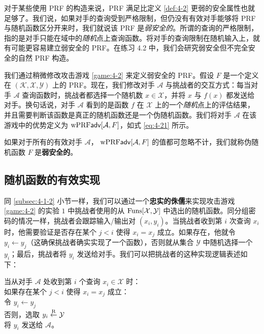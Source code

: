 \begin{snote}[弱安全的伪随机函数。]
对于某些使用 PRF 的构造来说，PRF 满足比定义 \ref{def:4-2} 更弱的安全属性也就足够了。我们说，如果对手的查询受到严格限制，但仍没有有效对手能够将 PRF 与随机函数区分开来时，我们就说该 PRF 是\emph{弱安全的}。所谓的查询的严格限制，指的是对手只能在域中的\emph{随机}点上查询函数。将对手的查询限制在随机输入上，就有可能更容易建立弱安全的 PRF。在练习 4.2 中，我们会研究弱安全但不完全安全的自然 PRF 构造。

我们通过稍微修改攻击游戏 \ref{game:4-2} 来定义弱安全的 PRF。假设 $F$ 是一个定义在 $(\mathcal{K},\mathcal{X},\mathcal{Y})$ 上的 PRF。现在，我们修改对手 $\mathcal{A}$ 与挑战者的交互方式：每当对手 $\mathcal{A}$ 查询函数时，挑战者都选择一个随机数 $x\in\mathcal{X}$，并将 $x$ 与 $f(x)$ 都发送给对手。换句话说，对手 $\mathcal{A}$ 看到的是函数 $f$ 在 $\mathcal{X}$ 上的一个\emph{随机}点上的评估结果，并且需要判断该函数是真正的随机函数还是一个伪随机函数。我们将对手 $\mathcal{A}$ 在该游戏中的优势定义为 ${\rm wPRF\mathsf{adv}}[\mathcal{A}, F]$，如式 \ref{eq:4-21} 所示。
\end{snote}

\begin{definition}\label{def:4-3}
如果对于所有的有效对手 $\mathcal{A}$， ${\rm wPRF\mathsf{adv}}[\mathcal{A}, F]$ 的值都可忽略不计，我们就称伪随机函数 $F$ 是\textbf{弱安全的}。
\end{definition}

\subsection{随机函数的有效实现}\label{subsec:4-4-2}

同 \ref{subsec:4-1-2} 小节一样，我们可以通过一个\textbf{忠实的侏儒}来实现攻击游戏 \ref{game:4-2} 的实验 $1$ 中挑战者使用的从 ${\rm Funs}[\mathcal{X},\mathcal{Y}]$ 中选出的随机函数。同分组密码的情况一样，挑战者会跟踪输入/输出对 $(x_i,y_i)$。当挑战者收到第 $i$ 次查询 $x_i$ 时，他需要验证是否存在某个 $j < i$ 使得 $x_i=x_j$ 成立。如果存在，他就令 $y_i\leftarrow y_j$（这确保挑战者确实实现了一个函数），否则就从集合 $\mathcal{Y}$ 中随机选择一个 $y_i$；最后，挑战者将 $y_i$ 发送给对手。我们可以把挑战者的这种实现逻辑表述如下：

\vspace{5pt}

\hspace*{5pt} 当从对手 $\mathcal{A}$ 处收到第 $i$ 个查询 $x_i\in\mathcal{X}$ 时：\\
\hspace*{50pt} 如果存在某个 $j<i$ 使得 $x_i=x_j$ 成立：\\
\hspace*{75pt} 令 $y_i\leftarrow y_j$\\
\hspace*{75pt} 否则，选取 $y_i\overset{\rm R}\leftarrow\mathcal{Y}$\\
\hspace*{50pt} 将 $y_i$ 发送给 $\mathcal{A}$。\\


